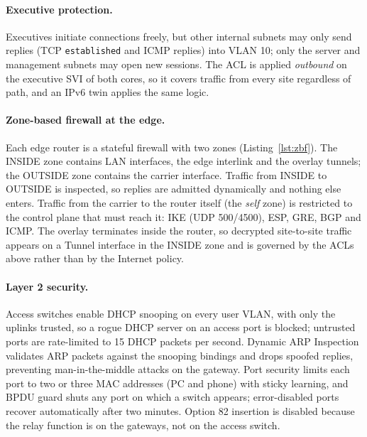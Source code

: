 \documentclass[11pt,a4paper]{article}
\begin{document}


\paragraph{Executive protection.} Executives initiate connections freely, but other internal subnets may only send replies (TCP \texttt{established} and ICMP replies) into VLAN 10; only the server and management subnets may open new sessions. The ACL is applied \emph{outbound} on the executive SVI of both cores, so it covers traffic from every site regardless of path, and an IPv6 twin applies the same logic.



\paragraph{Zone-based firewall at the edge.} Each edge router is a stateful firewall with two zones (Listing~\ref{lst:zbf}). The INSIDE zone contains LAN interfaces, the edge interlink and the overlay tunnels; the OUTSIDE zone contains the carrier interface. Traffic from INSIDE to OUTSIDE is inspected, so replies are admitted dynamically and nothing else enters. Traffic from the carrier to the router itself (the \emph{self} zone) is restricted to the control plane that must reach it: IKE (UDP 500/4500), ESP, GRE, BGP and ICMP. The overlay terminates inside the router, so decrypted site-to-site traffic appears on a Tunnel interface in the INSIDE zone and is governed by the ACLs above rather than by the Internet policy.



\paragraph{Layer 2 security.} Access switches enable DHCP snooping on every user VLAN, with only the uplinks trusted, so a rogue DHCP server on an access port is blocked; untrusted ports are rate-limited to 15 DHCP packets per second. Dynamic ARP Inspection validates ARP packets against the snooping bindings and drops spoofed replies, preventing man-in-the-middle attacks on the gateway. Port security limits each port to two or three MAC addresses (PC and phone) with sticky learning, and BPDU guard shuts any port on which a switch appears; error-disabled ports recover automatically after two minutes. Option 82 insertion is disabled because the relay function is on the gateways, not on the access switch.
\end{document}
